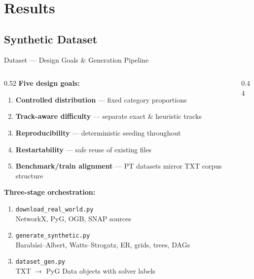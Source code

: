 \documentclass[aspectratio=169,10pt]{beamer}
\newcommand{\highlight}[1]{\textcolor{midblue}{\textbf{#1}}}
\renewcommand{\footnotesize}{\tiny}
\begin{document}
\section{Results}
\subsection{Synthetic Dataset}

\begin{frame}{Dataset — Design Goals \& Generation Pipeline}
  \begin{columns}[T]
    \begin{column}{0.52\textwidth}
      \textbf{Five design goals:}
      \begin{enumerate}\setlength\itemsep{2pt}
        \item \highlight{Controlled distribution} — fixed category proportions
        \item \highlight{Track-aware difficulty} — separate exact \& heuristic tracks
        \item \highlight{Reproducibility} — deterministic seeding throughout
        \item \highlight{Restartability} — safe reuse of existing files
        \item \highlight{Benchmark/train alignment} — PT datasets mirror
          TXT corpus structure
      \end{enumerate}
      \vspace{6pt}
      \textbf{Three-stage orchestration:}
      \begin{enumerate}
        \item \texttt{download\_real\_world.py}\\
          {\footnotesize NetworkX, PyG, OGB, SNAP sources}
        \item \texttt{generate\_synthetic.py}\\
          {\footnotesize Barabási–Albert, Watts–Strogatz, ER, grids, trees, DAGs}
        \item \texttt{dataset\_gen.py}\\
          {\footnotesize TXT $\to$ PyG Data objects with solver labels}
      \end{enumerate}
    \end{column}
    \begin{column}{0.44\textwidth}
      \begin{tcolorbox}[mybox,title=Directory Contract]

\end{tcolorbox}
\end{column}
\end{columns}
\end{frame}
\end{document}
